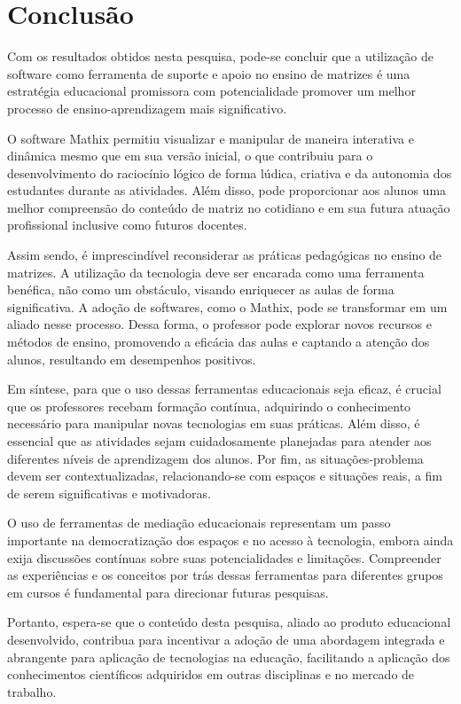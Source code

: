 
\chapter{Conclusão}
\label{conclusao}

Com os resultados obtidos nesta pesquisa, pode-se concluir que a utilização de software como ferramenta de suporte e apoio no ensino de matrizes é uma estratégia educacional promissora com potencialidade promover um melhor processo de ensino-aprendizagem mais significativo.

O software Mathix permitiu visualizar e manipular de maneira interativa e dinâmica mesmo que em sua versão inicial, o que contribuiu para o desenvolvimento do raciocínio lógico de forma lúdica, criativa e da autonomia dos estudantes durante as atividades. Além disso, pode proporcionar aos alunos uma melhor compreensão do conteúdo de matriz no cotidiano e em sua futura atuação profissional inclusive como futuros docentes.


Assim sendo, é imprescindível reconsiderar as práticas pedagógicas no ensino de matrizes. A utilização da tecnologia deve ser encarada como uma ferramenta benéfica, não como um obstáculo, visando enriquecer as aulas de forma significativa. A adoção de softwares, como o Mathix, pode se transformar em um aliado nesse processo. Dessa forma, o professor pode explorar novos recursos e métodos de ensino, promovendo a eficácia das aulas e captando a atenção dos alunos, resultando em desempenhos positivos.


Em síntese, para que o uso dessas ferramentas educacionais seja eficaz, é crucial que os professores recebam formação contínua, adquirindo o conhecimento necessário para manipular novas tecnologias em suas práticas. Além disso, é essencial que as atividades sejam cuidadosamente planejadas para atender aos diferentes níveis de aprendizagem dos alunos. Por fim, as situações-problema devem ser contextualizadas, relacionando-se com espaços e situações reais, a fim de serem significativas e motivadoras.

O uso de ferramentas de mediação educacionais representam um passo importante na democratização dos espaços e no acesso à tecnologia, embora ainda exija discussões contínuas sobre suas potencialidades e limitações. Compreender as experiências e os conceitos por trás dessas ferramentas para diferentes grupos em cursos é fundamental para direcionar futuras pesquisas.


Portanto, espera-se que o conteúdo desta pesquisa, aliado ao produto educacional desenvolvido, contribua para incentivar a adoção de uma abordagem integrada e abrangente para aplicação de tecnologias na educação, facilitando a aplicação dos conhecimentos científicos adquiridos em outras disciplinas e no mercado de trabalho.



